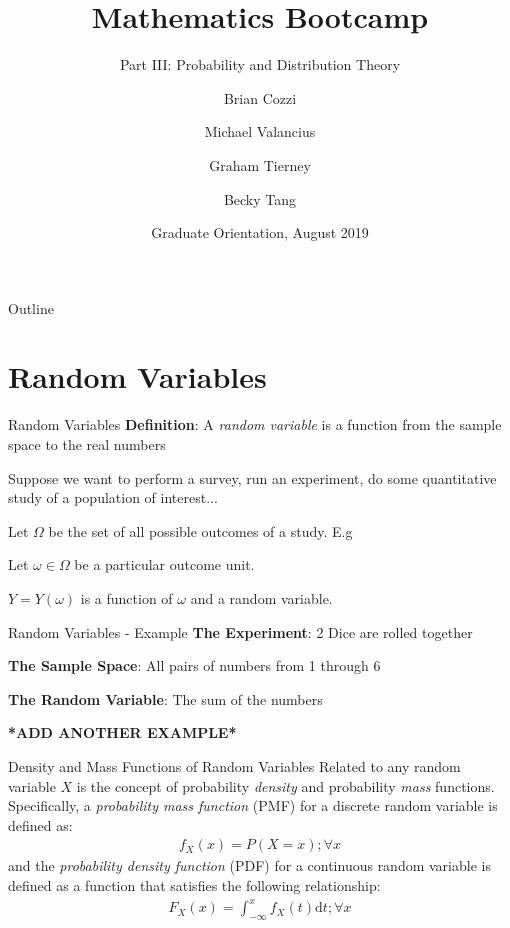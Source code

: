\documentclass{beamer}
\title{Mathematics Bootcamp}
\subtitle{Part III: Probability and Distribution Theory}
\author{Brian Cozzi\inst{1} \and Michael Valancius\inst{1} \and Graham Tierney\inst{1} \and Becky Tang\inst{1}}
\institute[Duke University] %
{
  \inst{1}%
  Department of Statistical Science\\
  Duke University
  }
\date{Graduate Orientation, August 2019}
\begin{document}
\begin{frame}
  \titlepage
\end{frame}

\begin{frame}{Outline}
  \tableofcontents
\end{frame}

\section{Random Variables}
\begin{frame}{Random Variables}
\textbf{Definition}:
A \emph{random variable} is a function from the sample space to the real numbers 

\newline

Suppose we want to perform a survey, run an experiment, do some quantitative study of a population of interest...

Let $\Omega$ be the set of all possible outcomes of a study. E.g
\newline

Let $\omega \in \Omega$ be a particular outcome unit.
\newline

$Y = Y(\omega)$ is a function of $\omega$ and a random variable. 
\end{frame}


\begin{frame}{Random Variables - Example}
\textbf{The Experiment}:
2 Dice are rolled together

\textbf{The Sample Space}:
All pairs of numbers from 1 through 6

\textbf{The Random Variable}:
The sum of the numbers 

\textbf{*ADD ANOTHER EXAMPLE*}

\end{frame}


\begin{frame}{Density and Mass Functions of Random Variables}
Related to any random variable $X$ is the concept of probability \emph{density} and probability \emph{mass} functions. Specifically, a \emph{probability mass function} (PMF) for a discrete random variable is defined as:
\begin{align*}
f_{X}(x) = P(X = x); \forall x
\end{align*}
and the \emph{probability density function} (PDF) for a continuous random variable is defined as a function that satisfies the following relationship:
\begin{align*}
F_{X}(x) = \int_{-\infty}^{x}f_{X}(t) \mathrm{d}t; \forall x
\end{align*}
\end{frame}
\end{document}
